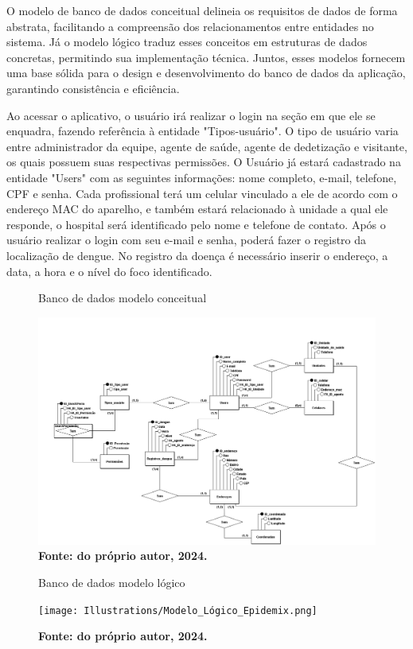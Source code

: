 O modelo de banco de dados conceitual delineia os requisitos de dados de forma abstrata, facilitando a compreensão dos relacionamentos entre entidades no sistema. Já o modelo lógico traduz esses conceitos em estruturas de dados concretas, permitindo sua implementação técnica. Juntos, esses modelos fornecem uma base sólida para o design e desenvolvimento do banco de dados da aplicação, garantindo consistência e eficiência. 

Ao acessar o aplicativo, o usuário irá realizar o login na seção em que ele se enquadra, fazendo referência à entidade "Tipos-usuário". O tipo de usuário varia entre administrador da equipe, agente de saúde, agente de dedetização e visitante, os quais possuem suas respectivas permissões. O Usuário já estará cadastrado na entidade "Users" com as seguintes informações: nome completo, e-mail, telefone, CPF e senha. Cada profissional terá um celular vinculado a ele de acordo com o endereço MAC do aparelho, e também estará relacionado à unidade a qual ele responde, o hospital será identificado pelo nome e telefone de contato. Após o usuário realizar o login com seu e-mail e senha, poderá fazer o registro da localização de dengue. No registro da doença é necessário inserir o endereço, a data, a hora e o nível do foco identificado.

\begin{figure}[H]
    \centering
    \caption{Banco de dados modelo conceitual}
    \includegraphics[width=1.0\linewidth]{Illustrations/Modelo_Conceitual Epidemix.png}
    \caption*{\textbf{Fonte: do próprio autor, 2024.}}
\end{figure}

\begin{figure}[H]
    \centering
    \caption{Banco de dados modelo lógico}
    \texttt{[image: Illustrations/Modelo\_Lógico\_Epidemix.png]}
    \caption*{\textbf{Fonte: do próprio autor, 2024.}}
\end{figure}

